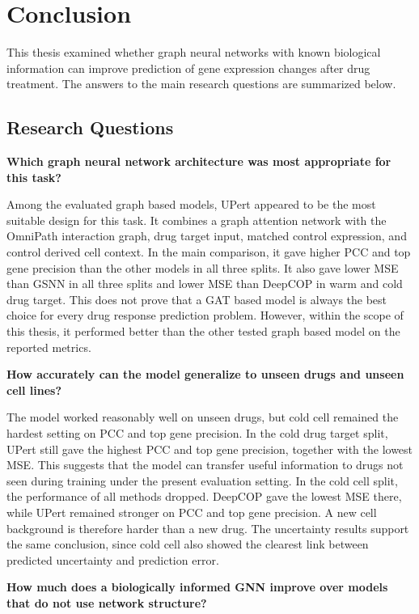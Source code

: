 \chapter{Conclusion}

\noindent This thesis examined whether graph neural networks with known biological information can improve prediction of gene expression changes after drug treatment. The answers to the main research questions are summarized below.

\section{Research Questions}

\noindent \textbf{Which graph neural network architecture was most appropriate for this task?}

\noindent Among the evaluated graph based models, UPert appeared to be the most suitable design for this task. It combines a graph attention network with the OmniPath interaction graph, drug target input, matched control expression, and control derived cell context. In the main comparison, it gave higher PCC and top gene precision than the other models in all three splits. It also gave lower MSE than GSNN in all three splits and lower MSE than DeepCOP in warm and cold drug target. This does not prove that a GAT based model is always the best choice for every drug response prediction problem. However, within the scope of this thesis, it performed better than the other tested graph based model on the reported metrics.

\noindent \textbf{How accurately can the model generalize to unseen drugs and unseen cell lines?}

\noindent The model worked reasonably well on unseen drugs, but cold cell remained the hardest setting on PCC and top gene precision. In the cold drug target split, UPert still gave the highest PCC and top gene precision, together with the lowest MSE. This suggests that the model can transfer useful information to drugs not seen during training under the present evaluation setting. In the cold cell split, the performance of all methods dropped. DeepCOP gave the lowest MSE there, while UPert remained stronger on PCC and top gene precision. A new cell background is therefore harder than a new drug. The uncertainty results support the same conclusion, since cold cell also showed the clearest link between predicted uncertainty and prediction error.

\noindent \textbf{How much does a biologically informed GNN improve over models that do not use network structure?}

